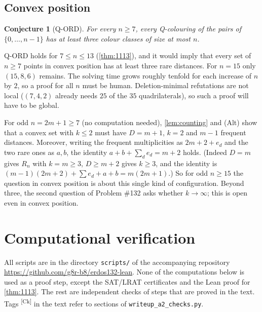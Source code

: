 \documentclass[11pt]{amsart}
\newtheorem{conjecture}[theorem]{Conjecture}
\theoremstyle{definition}
\theoremstyle{remark}
\newcommand{\chk}[1]{\textsuperscript{[#1]}}
\begin{document}
\subsection*{Convex position}
\begin{conjecture}[Q-ORD]\label{conj:QORD}
For every $n\ge7$, every Q-colouring of the pairs of $\{0,\dots,n-1\}$ has at least three colour classes of size at most $n$.
\end{conjecture}
Q-ORD holds for $7\le n\le13$ (\cref{thm:1113}), and it would imply that every set of $n\ge7$ points in convex position has at least three rare distances. For $n=15$ only $(15,8,6)$ remains. The solving time grows roughly tenfold for each increase of $n$ by $2$, so a proof for all $n$ must be human. Deletion-minimal refutations are not local ($(7,4,2)$ already needs $25$ of the $35$ quadrilaterals), so such a proof will have to be global.

For odd $n=2m+1\ge7$ (no computation needed), \cref{lem:counting} and (Alt) show that a convex set with $k\le2$ must have $D=m+1$, $k=2$ and $m-1$ frequent distances. Moreover, writing the frequent multiplicities as $2m+2+e_d$ and the two rare ones as $a,b$, the identity $a+b+\sum_de_d=m+2$ holds. (Indeed $D=m$ gives $R_n$ with $k=m\ge3$, $D\ge m+2$ gives $k\ge3$, and the identity is $(m-1)(2m+2)+\sum e_d+a+b=m(2m+1)$.) So for odd $n\ge15$ the question in convex position is about this single kind of configuration. Beyond three, the second question of Problem \#132 asks whether $k\to\infty$; this is open even in convex position.

\appendix
\section{Computational verification}\label{app:verification}

All scripts are in the directory \texttt{scripts/} of the accompanying repository \url{https://github.com/g8r-b8/erdos132-lean}. None of the computations below is used as a proof step, except the SAT/LRAT certificates and the Lean proof for \cref{thm:1113}. The rest are independent checks of steps that are proved in the text. Tags \chk{Ck} in the text refer to sections of \texttt{writeup\_a2\_checks.py}.
\end{document}
